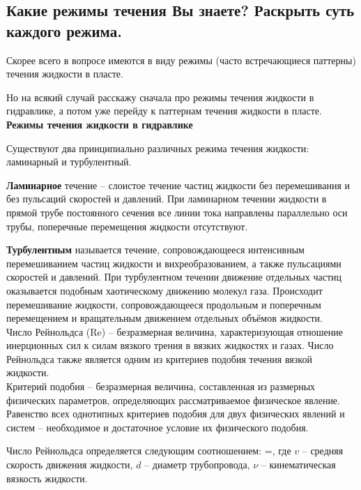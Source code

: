 

\subsection{Какие режимы течения Вы знаете? Раскрыть суть каждого режима.}

Скорее всего в вопросе имеются в виду режимы (часто встречающиеся паттерны) течения жидкости в пласте.

Но на всякий случай расскажу сначала про режимы течения жидкости в гидравлике, а потом уже перейду к паттернам течения жидкости в пласте.
\\

\textbf{Режимы течения жидкости в гидравлике}

Существуют два принципиально различных режима течения жидкости: ламинарный и турбулентный.

\textbf{Ламинарное} течение -- слоистое течение частиц жидкости без перемешивания и без пульсаций скоростей и давлений.
При ламинарном течении жидкости в прямой трубе постоянного сечения все линии тока направлены параллельно оси трубы, поперечные перемещения жидкости отсутствуют.

\textbf{Турбулентным} называется течение, сопровождающееся интенсивным перемешиванием частиц жидкости и вихреобразованием, а также пульсациями скоростей и давлений.
При турбулентном течении движение отдельных частиц оказывается подобным хаотическому движению молекул газа.
Происходит перемешивание жидкости, сопровождающееся продольным и поперечным перемещением и вращательным движением отдельных объёмов жидкости.
\\

Число Рейнольдса (Re) -- безразмерная величина, характеризующая отношение инерционных сил к силам вязкого трения в вязких жидкостях и газах.
Число Рейнольдса также является одним из критериев подобия течения вязкой жидкости.
\\

Критерий подобия -- безразмерная величина, составленная из размерных физических параметров, определяющих рассматриваемое физическое явление.
Равенство всех однотипных критериев подобия для двух физических явлений и систем -- необходимое и достаточное условие их физического подобия.

Число Рейнольдса определяется следующим соотношением:
\beq
{}=,
\eeq
где $v$ -- средняя скорость движения жидкости, $d$ -- диаметр трубопровода, $\nu$ -- кинематическая вязкость жидкости.
\\


